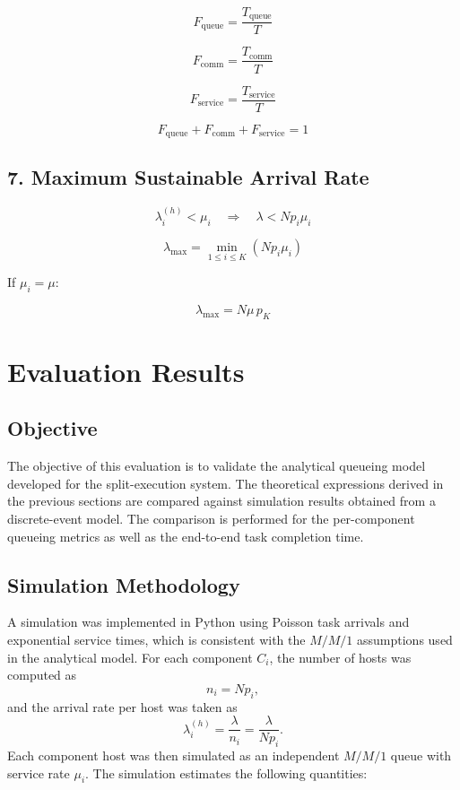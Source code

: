 \documentclass[12pt,a4paper]{article}
\begin{document}
\[
F_{\text{queue}} = \frac{T_{\text{queue}}}{T}
\]

\[
F_{\text{comm}} = \frac{T_{\text{comm}}}{T}
\]

\[
F_{\text{service}} = \frac{T_{\text{service}}}{T}
\]

\[
F_{\text{queue}} + F_{\text{comm}} + F_{\text{service}} = 1
\]

\subsection*{7. Maximum Sustainable Arrival Rate}

\[
\lambda_i^{(h)} < \mu_i
\quad\Rightarrow\quad
\lambda < Np_i\mu_i
\]

\[
\boxed{
\lambda_{\max} = \min_{1\le i \le K} \left(Np_i\mu_i\right)
}
\]

If $\mu_i=\mu$:

\[
\lambda_{\max} = N\mu\,p_K
\]

\section{Evaluation Results}

\subsection{Objective}
The objective of this evaluation is to validate the analytical queueing model developed for the split-execution system. The theoretical expressions derived in the previous sections are compared against simulation results obtained from a discrete-event model. The comparison is performed for the per-component queueing metrics as well as the end-to-end task completion time.

\subsection{Simulation Methodology}
A simulation was implemented in Python using Poisson task arrivals and exponential service times, which is consistent with the $M/M/1$ assumptions used in the analytical model. For each component $C_i$, the number of hosts was computed as
\[
n_i = Np_i,
\]
and the arrival rate per host was taken as
\[
\lambda_i^{(h)} = \frac{\lambda}{n_i} = \frac{\lambda}{Np_i}.
\]
Each component host was then simulated as an independent $M/M/1$ queue with service rate $\mu_i$. The simulation estimates the following quantities:
\end{document}
